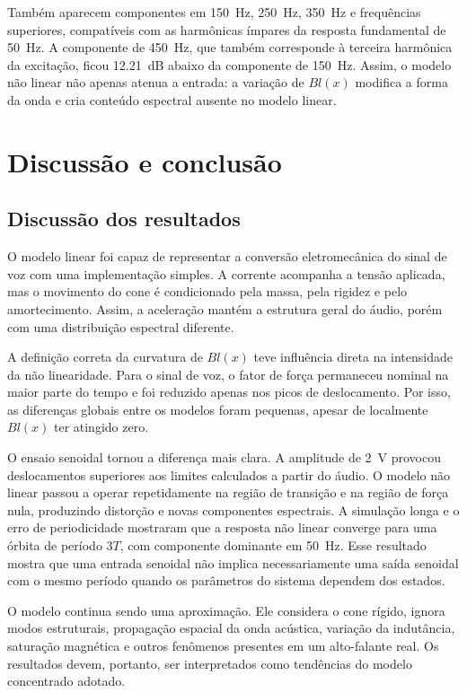 \documentclass[12pt,letterpaper]{article}
\begin{document}
Também aparecem componentes em \SI{150}{Hz}, \SI{250}{Hz}, \SI{350}{Hz} e
frequências superiores, compatíveis com as harmônicas ímpares da resposta
fundamental de \SI{50}{Hz}. A componente de \SI{450}{Hz}, que também
corresponde à terceira harmônica da excitação, ficou \SI{12.21}{dB} abaixo da
componente de \SI{150}{Hz}. Assim, o modelo não linear não apenas atenua a
entrada: a variação de $Bl(x)$ modifica a forma da onda e cria conteúdo
espectral ausente no modelo linear.

\section{Discussão e conclusão}

\subsection{Discussão dos resultados}

O modelo linear foi capaz de representar a conversão eletromecânica do sinal de
voz com uma implementação simples. A corrente acompanha a tensão aplicada, mas
o movimento do cone é condicionado pela massa, pela rigidez e pelo
amortecimento. Assim, a aceleração mantém a estrutura geral do áudio, porém com
uma distribuição espectral diferente.

A definição correta da curvatura de $Bl(x)$ teve influência direta na intensidade
da não linearidade. Para o sinal de voz, o fator de força permaneceu nominal na
maior parte do tempo e foi reduzido apenas nos picos de deslocamento. Por isso,
as diferenças globais entre os modelos foram pequenas, apesar de localmente
$Bl(x)$ ter atingido zero.

O ensaio senoidal tornou a diferença mais clara. A amplitude de \SI{2}{V}
provocou deslocamentos superiores aos limites calculados a partir do áudio. O
modelo não linear passou a operar repetidamente na região de transição e na
região de força nula, produzindo distorção e novas componentes espectrais. A
simulação longa e o erro de periodicidade mostraram que a resposta não linear
converge para uma órbita de período $3T$, com componente dominante em
\SI{50}{Hz}. Esse resultado mostra que uma entrada senoidal não implica
necessariamente uma saída senoidal com o mesmo período quando os parâmetros do
sistema dependem dos estados.

O modelo continua sendo uma aproximação. Ele considera o cone rígido, ignora
modos estruturais, propagação espacial da onda acústica, variação da indutância,
saturação magnética e outros fenômenos presentes em um alto-falante real. Os
resultados devem, portanto, ser interpretados como tendências do modelo
concentrado adotado.
\end{document}
